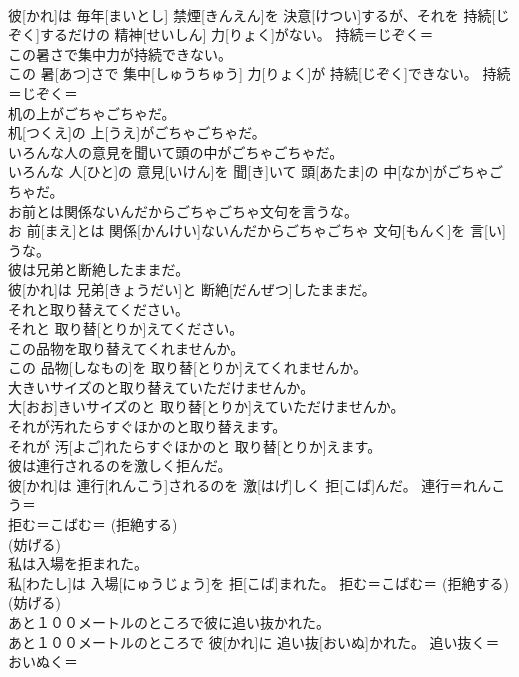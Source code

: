 \documentclass[8pt]{extreport}
\begin{document}
\begin{CJK}{UTF8}{min}
{\\	彼[かれ]は 毎年[まいとし] 禁煙[きんえん]を 決意[けつい]するが、それを 持続[じぞく]するだけの 精神[せいしん] 力[りょく]がない。	持続＝じぞく＝ 
\\	この暑さで集中力が持続できない。	
\\	この 暑[あつ]さで 集中[しゅうちゅう] 力[りょく]が 持続[じぞく]できない。	持続＝じぞく＝ 
\\	机の上がごちゃごちゃだ。	
\\	机[つくえ]の 上[うえ]がごちゃごちゃだ。	
\\	いろんな人の意見を聞いて頭の中がごちゃごちゃだ。	
\\	いろんな 人[ひと]の 意見[いけん]を 聞[き]いて 頭[あたま]の 中[なか]がごちゃごちゃだ。	
\\	お前とは関係ないんだからごちゃごちゃ文句を言うな。	
\\	お 前[まえ]とは 関係[かんけい]ないんだからごちゃごちゃ 文句[もんく]を 言[い]うな。	
\\	彼は兄弟と断絶したままだ。	
\\	彼[かれ]は 兄弟[きょうだい]と 断絶[だんぜつ]したままだ。	
\\	それと取り替えてください。	
\\	それと 取り替[とりか]えてください。	
\\	この品物を取り替えてくれませんか。	
\\	この 品物[しなもの]を 取り替[とりか]えてくれませんか。	
\\	大きいサイズのと取り替えていただけませんか。	
\\	大[おお]きいサイズのと 取り替[とりか]えていただけませんか。	
\\	それが汚れたらすぐほかのと取り替えます。	
\\	それが 汚[よご]れたらすぐほかのと 取り替[とりか]えます。	
\\	彼は連行されるのを激しく拒んだ。	
\\	彼[かれ]は 連行[れんこう]されるのを 激[はげ]しく 拒[こば]んだ。	連行＝れんこう＝ 
\\	拒む＝こばむ＝ (拒絶する) 
\\	(妨げる) 
\\	私は入場を拒まれた。	
\\	私[わたし]は 入場[にゅうじょう]を 拒[こば]まれた。	拒む＝こばむ＝ (拒絶する) 
\\	(妨げる) 
\\	あと１００メートルのところで彼に追い抜かれた。	
\\	あと１００メートルのところで 彼[かれ]に 追い抜[おいぬ]かれた。	追い抜く＝おいぬく＝ 
}
\end{CJK}
\end{document}
